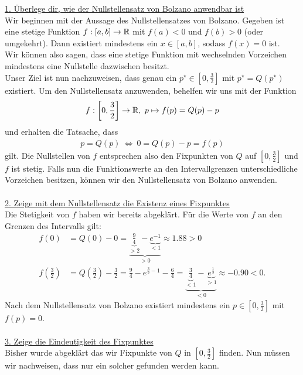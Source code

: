 \underline{1. Überlege dir, wie der Nullstellensatz von Bolzano anwendbar ist}\\
Wir beginnen mit der Aussage des Nullstellensatzes von Bolzano.
Gegeben ist eine stetige Funktion $  f : [a,b] \to \mathbb{R} $ mit $ f(a) < 0 $ und $ f(b) > 0 $ (oder umgekehrt).
Dann existiert mindestens ein $ x \in [a,b] $, sodass $ f(x) = 0 $ ist.\\
Wir können also sagen, dass eine stetige Funktion mit wechselnden Vorzeichen mindestens eine Nullstelle dazwischen besitzt.\\
Unser Ziel ist nun nachzuweisen, dass genau ein $ p^\star \in \left[0,\frac{3}{2}\right] $ mit $ p^\star = Q(p^\star) $ existiert. Um den Nullstellensatz anzuwenden, behelfen wir uns mit der Funktion
\begin{align*} 
	f : \left[0,\frac{3}{2}\right] \to \mathbb{R}, \ p \mapsto f(p) = Q(p) - p
\end{align*}
und erhalten die Tatsache, dass
\begin{align*}
	 p = Q(p)  \ \Leftrightarrow \ 0 = Q(p) - p = f(p)
\end{align*}
gilt. Die Nullstellen von $ f $ entsprechen also den Fixpunkten von $ Q $ auf $ \left[0,\frac{3}{2}\right] $ und $ f $ ist stetig. Falls nun die Funktionswerte an den Intervallgrenzen unterschiedliche Vorzeichen besitzen, können wir den Nullstellensatz von Bolzano anwenden.\\
\\
\underline{2. Zeige mit dem Nullstellensatz die Existenz eines Fixpunktes}\\
Die Stetigkeit von $ f $ haben wir bereits abgeklärt. Für die Werte von $ f $ an den Grenzen des Intervalls gilt:
\begin{align*}
	f(0) &= Q(0) - 0 = \underbrace{\underbrace{\frac{9}{4}}_{> 2}- \underbrace{e^{-1}}_{< 1}}_{>0 } \approx 1.88 > 0\\
	f\left(\frac{3}{2}\right)
	&= 
	Q\left(\frac{3}{2}\right) - \frac{3}{2}
	=
	\frac{9}{4} - e^{\frac{3}{2} - 1} - \frac{6}{4}
	=
	\underbrace{\underbrace{\frac{3}{4}}_{< 1} - \underbrace{e^{\frac{1}{2}}}_{> 1}}_{< 0} \approx -0.90 <  0.
\end{align*}
Nach dem Nullstellensatz von Bolzano existiert mindestens ein $ p \in \left[0,\frac{3}{2}\right]  $ mit $ f(p) = 0$.\\
\\
\newpage
\underline{3. Zeige die Eindeutigkeit des Fixpunktes}\\
Bisher wurde abgeklärt das wir Fixpunkte von $ Q $ in $ \left[0,\frac{3}{2}\right] $ finden. Nun müssen wir nachweisen, dass nur ein solcher gefunden werden kann.
